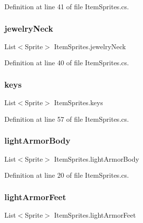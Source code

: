 Definition at line 41 of file Item\+Sprites.\+cs.

\mbox{\label{class_item_sprites_a9300f918883596e0fe67446651ffbf2f}} 
\subsubsection{\texorpdfstring{jewelryNeck}{jewelryNeck}}
{\footnotesize\ttfamily List$<$Sprite$>$ Item\+Sprites.\+jewelry\+Neck}



Definition at line 40 of file Item\+Sprites.\+cs.

\mbox{\label{class_item_sprites_a5a4563f367a36043042b56d70f58fe0b}} 
\subsubsection{\texorpdfstring{keys}{keys}}
{\footnotesize\ttfamily List$<$Sprite$>$ Item\+Sprites.\+keys}



Definition at line 57 of file Item\+Sprites.\+cs.

\mbox{\label{class_item_sprites_aee2febc3fec994b0c7cf25a77cd7dc36}} 
\subsubsection{\texorpdfstring{lightArmorBody}{lightArmorBody}}
{\footnotesize\ttfamily List$<$Sprite$>$ Item\+Sprites.\+light\+Armor\+Body}



Definition at line 20 of file Item\+Sprites.\+cs.

\mbox{\label{class_item_sprites_a5ab90ba7ee1163f578f19bcb4aa90b5f}} 
\subsubsection{\texorpdfstring{lightArmorFeet}{lightArmorFeet}}
{\footnotesize\ttfamily List$<$Sprite$>$ Item\+Sprites.\+light\+Armor\+Feet}



